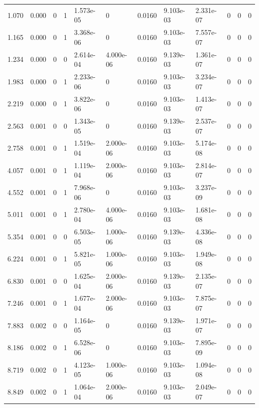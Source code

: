 \documentclass[preview]{standalone}
\begin{document}
{{\begin{tabular}{L{1.2cm}C{1.2cm} C{0.3cm}C{0.5cm} C{1.4cm}C{1.4cm} C{1.4cm}C{1.4cm} C{1.6cm}C{1.6cm} C{1.6cm}C{1.6cm}}
  1.070  &  0.000  & 0     &  1 &  1.573e-05  & 0  &  0.0160&   9.103e-03& 2.331e-07 & 0   &  0 & 0  \\ 
  1.165  &  0.000  & 0     &  1 &  3.368e-06  & 0  &  0.0160&   9.103e-03& 7.557e-07 & 0   &  0 & 0  \\ 
  1.234  &  0.000  & 0     &  0 &  2.614e-04  & 4.000e-06  &  0.0160&   9.139e-03& 1.361e-07 & 0   &  0 & 0  \\ 
  1.983  &  0.000  & 0     &  1 &  2.233e-06  & 0  &  0.0160&   9.103e-03& 3.234e-07 & 0   &  0 & 0  \\ 
  2.219  &  0.000  & 0     &  1 &  3.822e-06  & 0  &  0.0160&   9.103e-03& 1.413e-07 & 0   &  0 & 0  \\ 
  2.563  &  0.001  & 0     &  0 &  1.343e-05  & 0  &  0.0160&   9.139e-03& 2.537e-07 & 0   &  0 & 0  \\ 
  2.758  &  0.001  & 0     &  1 &  1.519e-04  & 2.000e-06  &  0.0160&   9.103e-03& 5.174e-08 & 0   &  0 & 0  \\ 
  4.057  &  0.001  & 0     &  1 &  1.119e-04  & 2.000e-06  &  0.0160&   9.103e-03& 2.814e-07 & 0   &  0 & 0  \\ 
  4.552  &  0.001  & 0     &  1 &  7.968e-06  & 0  &  0.0160&   9.103e-03& 3.237e-09 & 0   &  0 & 0  \\ 
  5.011  &  0.001  & 0     &  1 &  2.780e-04  & 4.000e-06  &  0.0160&   9.103e-03& 1.681e-08 & 0   &  0 & 0  \\ 
  5.354  &  0.001  & 0     &  0 &  6.503e-05  & 1.000e-06  &  0.0160&   9.139e-03& 4.336e-08 & 0   &  0 & 0  \\ 
  6.224  &  0.001  & 0     &  1 &  5.821e-05  & 1.000e-06  &  0.0160&   9.103e-03& 1.949e-08 & 0   &  0 & 0  \\ 
  6.830  &  0.001  & 0     &  0 &  1.625e-04  & 2.000e-06  &  0.0160&   9.139e-03& 2.135e-07 & 0   &  0 & 0  \\ 
  7.246  &  0.001  & 0     &  1 &  1.677e-04  & 2.000e-06  &  0.0160&   9.103e-03& 7.875e-07 & 0   &  0 & 0  \\ 
  7.883  &  0.002  & 0     &  0 &  1.164e-05  & 0  &  0.0160&   9.139e-03& 1.971e-07 & 0   &  0 & 0  \\ 
  8.186  &  0.002  & 0     &  1 &  6.528e-06  & 0  &  0.0160&   9.103e-03& 7.895e-09 & 0   &  0 & 0  \\ 
  8.719  &  0.002  & 0     &  1 &  4.123e-05  & 1.000e-06  &  0.0160&   9.103e-03& 1.094e-08 & 0   &  0 & 0  \\ 
  8.849  &  0.002  & 0     &  1 &  1.064e-04  & 2.000e-06  &  0.0160&   9.103e-03& 2.049e-07 & 0   &  0 & 0  \\ 

\end{tabular}}}
\end{document}
